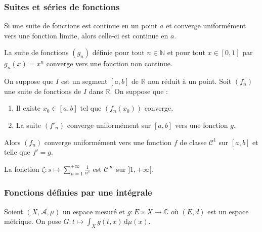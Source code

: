   \subsubsection{Suites et séries de fonctions}


  \begin{proposition}
    Si une suite de fonctions est continue en un point $a$ et converge uniformément vers une fonction limite, alors celle-ci est continue en $a$.
  \end{proposition}

  \begin{cexample}
    La suite de fonctions $(g_n)$ définie pour tout $n \in \mathbb{N}$ et pour tout $x \in [0,1]$ par $g_n(x) = x^n$ converge vers une fonction non continue.
  \end{cexample}

  \begin{proposition}
    On suppose que $I$ est un segment $[a,b]$ de $\mathbb{R}$ non réduit à un point. Soit $(f_n)$ une suite de fonctions de $I$ dans $\mathbb{R}$. On suppose que :
    \begin{enumerate}[label={\bfseries(\roman*)}]
      \item Il existe $x_0 \in [a,b]$ tel que $(f_n(x_0))$ converge.
      \item La suite $(f'_n)$ converge uniformément sur $[a,b]$ vers une fonction $g$.
    \end{enumerate}
    Alors $(f_n)$ converge uniformément vers une fonction $f$ de classe $\mathcal{C}^1$ sur $[a,b]$ et telle que $f'=g$.
  \end{proposition}


  \begin{example}
    La fonction $\zeta : s \mapsto \sum_{n=1}^{+\infty} \frac{1}{n^s}$ est $\mathcal{C}^\infty$ sur $]1,+\infty[$.
  \end{example}

  \subsubsection{Fonctions définies par une intégrale}


  Soient $(X, \mathcal{A}, \mu)$ un espace mesuré et $g : E \times X \rightarrow \mathbb{C}$ où $(E, d)$ est un espace métrique. On pose $G : t \mapsto \int_X g(t, x) \, \mathrm{d}\mu(x)$.

